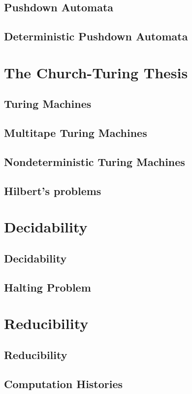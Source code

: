 \section{Pushdown Automata}
\section{Deterministic Pushdown Automata}

\chapter{The Church-Turing Thesis}

\section{Turing Machines}
\section{Multitape Turing Machines}
\section{Nondeterministic Turing Machines}
\section{Hilbert's problems}

\chapter{Decidability}

\section{Decidability}
\section{Halting Problem}

\chapter{Reducibility}

\section{Reducibility}
\section{Computation Histories}

